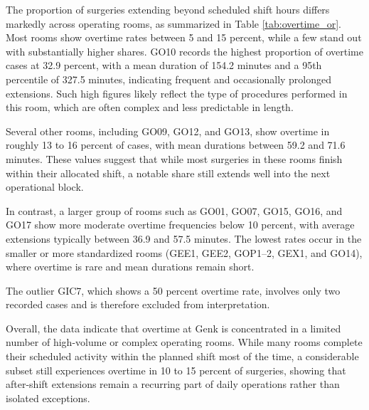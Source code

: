 \documentclass[
]{article}
\begin{document}
The proportion of surgeries extending beyond scheduled shift hours
differs markedly across operating rooms, as summarized in Table
\ref{tab:overtime_or}. Most rooms show overtime rates between 5 and 15
percent, while a few stand out with substantially higher shares. GO10
records the highest proportion of overtime cases at 32.9 percent, with a
mean duration of 154.2 minutes and a 95th percentile of 327.5 minutes,
indicating frequent and occasionally prolonged extensions. Such high
figures likely reflect the type of procedures performed in this room,
which are often complex and less predictable in length.

Several other rooms, including GO09, GO12, and GO13, show overtime in
roughly 13 to 16 percent of cases, with mean durations between 59.2 and
71.6 minutes. These values suggest that while most surgeries in these
rooms finish within their allocated shift, a notable share still extends
well into the next operational block.

In contrast, a larger group of rooms such as GO01, GO07, GO15, GO16, and
GO17 show more moderate overtime frequencies below 10 percent, with
average extensions typically between 36.9 and 57.5 minutes. The lowest
rates occur in the smaller or more standardized rooms (GEE1, GEE2,
GOP1--2, GEX1, and GO14), where overtime is rare and mean durations
remain short.

The outlier GIC7, which shows a 50 percent overtime rate, involves only
two recorded cases and is therefore excluded from interpretation.

Overall, the data indicate that overtime at Genk is concentrated in a
limited number of high-volume or complex operating rooms. While many
rooms complete their scheduled activity within the planned shift most of
the time, a considerable subset still experiences overtime in 10 to 15
percent of surgeries, showing that after-shift extensions remain a
recurring part of daily operations rather than isolated exceptions.
\end{document}
